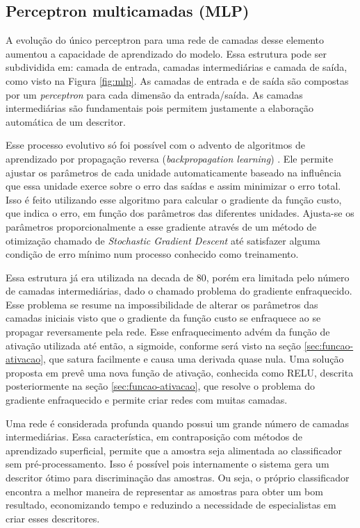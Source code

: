 \subsection{Perceptron multicamadas (MLP)}
A evolução do único perceptron para uma rede de camadas desse elemento aumentou a capacidade de aprendizado do modelo. Essa estrutura pode ser subdividida em: camada de entrada, camadas intermediárias e camada de saída, como visto na Figura \ref{fig:mlp}. As camadas de entrada e de saída são compostas por um \textit{perceptron} para cada dimensão da entrada/saída. As camadas intermediárias são fundamentais pois permitem justamente a elaboração automática de um descritor.

Esse processo evolutivo só foi possível com o advento de algoritmos de aprendizado por propagação reversa (\textit{backpropagation learning}) \cite{backpropagation}. Ele  permite ajustar os parâmetros de cada unidade automaticamente baseado na influência que essa unidade exerce sobre o erro das saídas e assim minimizar o erro total. Isso é feito utilizando esse algoritmo para calcular o gradiente da função custo, que indica o erro, em função dos parâmetros das diferentes unidades. Ajusta-se os parâmetros proporcionalmente a esse gradiente através de um método de otimização chamado de \textit{Stochastic Gradient Descent} \cite{DLbook} até satisfazer alguma condição de erro mínimo num processo conhecido como treinamento.

Essa estrutura já era utilizada na decada de 80, porém era limitada pelo número de camadas intermediárias, dado o chamado problema do gradiente enfraquecido. Esse problema se resume na impossibilidade de alterar os parâmetros das camadas iniciais visto que o gradiente da função custo se enfraquece ao se propagar reversamente pela rede. Esse enfraquecimento advém da função de ativação utilizada até então, a sigmoide, conforme será visto na seção \ref{sec:funcao-ativacao}, que satura facilmente e causa uma derivada quase nula. Uma solução proposta em \cite{nair2010relu} prevê uma nova função de ativação, conhecida como RELU, descrita posteriormente na seção \ref{sec:funcao-ativacao}, que resolve o problema do gradiente enfraquecido e permite criar redes com muitas camadas.

Uma rede é considerada profunda quando possui um grande número de camadas intermediárias. Essa característica, em contraposição com métodos de aprendizado superficial, permite que a amostra seja alimentada ao classificador sem pré-processamento. Isso é possível pois internamente o sistema gera um descritor ótimo para discriminação das amostras. Ou seja, o próprio classificador encontra a melhor maneira de representar as amostras para obter um bom resultado, economizando tempo e reduzindo a necessidade de especialistas em criar esses descritores.


